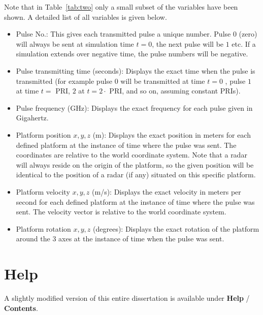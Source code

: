Note that in Table~\ref{tab:two} only a small subset of the variables have
been shown. A detailed list of all variables is given below.

\begin{itemize}
\item  Pulse No.: This gives each transmitted pulse a unique number. Pulse $0
$ (zero) will always be sent at simulation time $t=0$, the next pulse will
be $1$ etc. If a simulation extends over negative time, the pulse numbers
will be negative.

\item  Pulse transmitting time (seconds): Displays the exact time when the
pulse is transmitted (for example pulse $0$ will be transmitted at time $t=0$%
, pulse $1$ at time $t=$ PRI, $2$ at $t=2\cdot $ PRI, and so on, assuming
constant PRIs).

\item  Pulse frequency (GHz): Displays the exact frequency for each pulse
given in Gigahertz.

\item  Platform position $x,y,z$ (m): Displays the exact position in meters
for each defined platform at the instance of time where the pulse was sent.
The coordinates are relative to the world coordinate system. Note that a
radar will always reside on the origin of the platform, so the given
position will be identical to the position of a radar (if any) situated on
this specific platform.

\item  Platform velocity $x,y,z$ (m/s): Displays the exact velocity in
meters per second for each defined platform at the instance of time where
the pulse was sent. The velocity vector is relative to the world coordinate
system.

\item  Platform rotation $x,y,z$ (degrees): Displays the exact rotation of
the platform around the $3$ axes at the instance of time when the pulse was
sent.
\end{itemize}

\section{Help}

A slightly modified version of this entire dissertation is available under 
\textbf{Help} / \textbf{Contents}.

